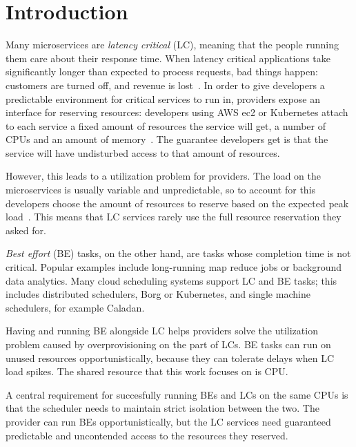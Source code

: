 \section{Introduction}
\label{s:intro}

Many microservices are \textit{latency critical} (LC), meaning that the people
running them care about their response time. When latency critical applications
take significantly longer than expected to process requests, bad things happen:
customers are turned off, and revenue is lost~\cite{google-speed-matters,
amz-speed-matters}. In order to give developers a predictable environment for
critical services to run in, providers expose an interface for reserving
resources: developers using AWS ec2 or Kubernetes attach to each service a fixed
amount of resources the service will get, \ie{} a number of CPUs and an amount
of memory~\cite{aws-ec2-resources, kubernetes-resources}. The guarantee
developers get is that the service will have undisturbed access to that amount
of resources.

However, this leads to a utilization problem for providers. The load on the
microservices is usually variable and unpredictable, so to account for this
developers choose the amount of resources to reserve based on the expected peak
load~\cite{borg, nu, overprovision}. This means that LC services rarely use the
full resource reservation they asked for.

\textit{Best effort} (BE) tasks, on the other hand, are tasks whose completion
time is not critical. Popular examples include long-running map reduce jobs or
background data analytics. Many cloud scheduling systems support LC and BE
tasks; this includes distributed schedulers, \eg{} Borg\cite{borg} or
Kubernetes\cite{kubernetes-resources}, and single machine schedulers, for
example Caladan\cite{caladan}.

Having and running BE alongside LC helps providers solve the utilization problem
caused by overprovisioning on the part of LCs. BE tasks can run on unused
resources opportunistically, because they can tolerate delays when LC load
spikes. The shared resource that this work focuses on is CPU.

A central requirement for succesfully running BEs and LCs on the same CPUs is
that the scheduler needs to maintain strict isolation between the two. The
provider can run BEs opportunistically, but the LC services need guaranteed
predictable and uncontended access to the resources they reserved. 

